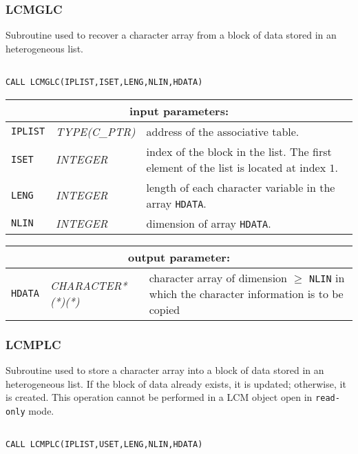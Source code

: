 \subsubsection{LCMGLC}\label{sect:LCMGLC}

Subroutine used to recover a character array from a block of data stored in an heterogeneous list.

\begin{verbatim}

CALL LCMGLC(IPLIST,ISET,LENG,NLIN,HDATA)
\end{verbatim}

\noindent
\begin{tabular}{|p{1.5cm}|p{3cm}|p{10cm}|}
\hline
\multicolumn{3}{|c|}{\bf input parameters:} \\
\hline
{\tt IPLIST} & {\it TYPE(C\_PTR)} & address of the associative table. \\
\hline
{\tt ISET} & {\it INTEGER} & index of the block in the list.
The first element of the list is located at index $1$. \\
\hline
{\tt LENG} & {\it INTEGER} & length of each character variable in the array {\tt HDATA}. \\
\hline
{\tt NLIN} & {\it INTEGER} & dimension of array {\tt HDATA}. \\
\hline
\end{tabular}

\vskip 0.8cm

\noindent
\begin{tabular}{|p{1.5cm}|p{3.5cm}|p{9.5cm}|}
\hline
\multicolumn{3}{|c|}{\bf output parameter:} \\
\hline
{\tt HDATA} & {\it CHARACTER*(*)(*)} & character array of dimension $\ge$ {\tt NLIN} in which the character information is to be copied \\
\hline
\end{tabular}

\subsubsection{LCMPLC}\label{sect:LCMPLC}

Subroutine used to store a character array into a block of data stored in an heterogeneous list.
If the block of data already exists, it is updated; otherwise, it is created. This operation cannot be performed
in a LCM object open in {\tt read-only} mode.

\begin{verbatim}

CALL LCMPLC(IPLIST,USET,LENG,NLIN,HDATA)
\end{verbatim}

